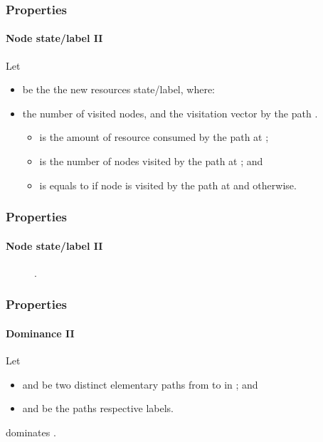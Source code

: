\begin{frame}
  \frametitle{Properties}
  \framesubtitle{Node state/label II}
  Let
  \begin{itemize}
    \item {} be the the  new resources state/label, where:
      \item the number of visited nodes, and the visitation vector by the path .
    \begin{itemize}
      \item {} is the amount of resource  consumed by the path  at ;
      \item {} is the number of nodes visited by the path  at ; and 
      \item {} is equals to  if node  is visited by the path  at  and  otherwise.
    \end{itemize}
  \end{itemize}
\end{frame}

\begin{frame}
  \frametitle{Properties}
  \framesubtitle{Node state/label II}
  \begin{figure}[H]
    \centering
    \caption{.}
    \label{fig:vrptw_disposable_example}
  \end{figure}
\end{frame}

\begin{frame}
  \frametitle{Properties}
  \framesubtitle{Dominance II}
  Let
  \begin{itemize}
    \item {} and  be two distinct elementary paths from  to  in ; and
    \item {} and  be the paths respective labels.
  \end{itemize}
  \begin{definition}
     dominates .
  \end{definition}
\end{frame}


